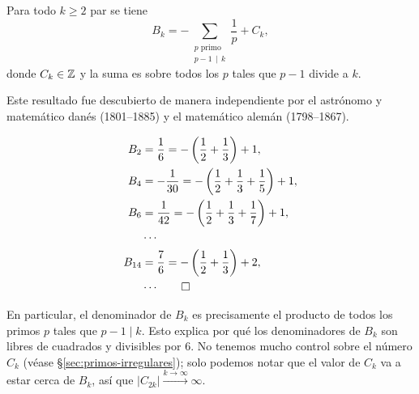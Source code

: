 \documentclass{article}
\numberwithin{equation}{section}
\theoremstyle{definition}
\begin{document}
\begin{teorema}
  Para todo $k \ge 2$ par se tiene
  $$B_k = -\sum_{\substack{p\text{ primo} \\ p-1 \, \mid \, k}} \frac{1}{p} + C_k,$$
  donde $C_k \in \mathbb{Z}$ y la suma es sobre todos los $p$ tales que $p-1$ divide a
  $k$.
\end{teorema}

Este resultado fue descubierto de manera independiente por el astrónomo y
matemático danés  (1801--1885) y el matemático
alemán  (1798--1867).

\begin{ejemplo}
  \begin{align*}
    B_2 & = \frac{1}{6} = - \left(\frac{1}{2} + \frac{1}{3}\right) + 1,\\
    B_4 & = -\frac{1}{30} = - \left(\frac{1}{2} + \frac{1}{3} + \frac{1}{5}\right) + 1,\\
    B_6 & = \frac{1}{42} = - \left(\frac{1}{2} + \frac{1}{3} + \frac{1}{7}\right) + 1,\\
        & \cdots \\
    B_{14} & = \frac{7}{6} = - \left(\frac{1}{2} + \frac{1}{3}\right) + 2,\\
        & \cdots \qedhere
  \end{align*}
\end{ejemplo}

En particular, el denominador de $B_k$ es precisamente el producto de todos
los primos $p$ tales que $p-1 \mid k$. Esto explica por qué los denominadores
de $B_k$ son libres de cuadrados y divisibles por $6$. No tenemos mucho control
sobre el número $C_k$ (véase \S\ref{sec:primos-irregulares}); solo podemos notar
que el valor de $C_k$ va a estar cerca de $B_k$, así que
$|C_{2k}| \xrightarrow{k \to \infty} \infty$.
\end{document}
